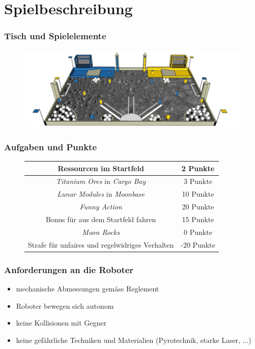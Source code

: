 \section{Spielbeschreibung}

\begin{frame}
	\frametitle{Tisch und Spielelemente}
	\begin{figure}
		\centering
		\includegraphics[width = 13cm]{../images/presentation/spielfeldElemente.jpg}
	\end{figure}
	
\end{frame}

\begin{frame}
	\frametitle{Aufgaben und Punkte}
	
	\begin{figure}[H]
		\centering
		\begin{tabular}{|c|c|}
			\hline
			Ressourcen im Startfeld & 2 Punkte\\
			\hline
			\textit{Titanium Ores} in \textit{Cargo Bay} & 3 Punkte\\
			\hline
			\textit{Lunar Modules} in \textit{Moonbase} & 10 Punkte\\
			\hline
			\textit{Funny Action} & 20 Punkte\\
			\hline
			Bonus für aus dem Startfeld fahren & 15 Punkte\\ 
			\hline
			\hline
			\textit{Moon Rocks} & 0 Punkte\\
			\hline
			Strafe für unfaires und regelwidriges Verhalten & -20 Punkte\\
			\hline
		\end{tabular}	
	\end{figure}
\end{frame}

\begin{frame}
	
	
	\frametitle{Anforderungen an die Roboter}
	
	\begin{itemize}
		\item mechanische Abmessungen gemäss Reglement
		\item Roboter bewegen sich autonom
		\item keine Kollisionen mit Gegner
		\item keine gefährliche Techniken und Materialien (Pyrotechnik, starke Laser, ...)
	\end{itemize}
	
\end{frame}

